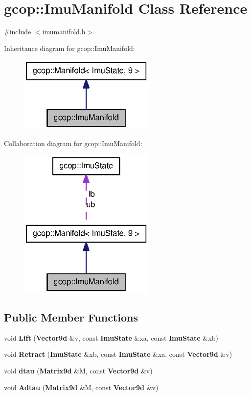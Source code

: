 \section{gcop\-:\-:\-Imu\-Manifold \-Class \-Reference}
\label{classgcop_1_1ImuManifold}


{\ttfamily \#include $<$imumanifold.\-h$>$}



\-Inheritance diagram for gcop\-:\-:\-Imu\-Manifold\-:\nopagebreak
\begin{figure}[H]
\begin{center}
\leavevmode
\includegraphics[width=192pt]{classgcop_1_1ImuManifold__inherit__graph}
\end{center}
\end{figure}


\-Collaboration diagram for gcop\-:\-:\-Imu\-Manifold\-:\nopagebreak
\begin{figure}[H]
\begin{center}
\leavevmode
\includegraphics[width=192pt]{classgcop_1_1ImuManifold__coll__graph}
\end{center}
\end{figure}
\subsection*{\-Public \-Member \-Functions}
\begin{DoxyCompactItemize}
\item 
void {\bf \-Lift} ({\bf \-Vector9d} \&v, const {\bf \-Imu\-State} \&xa, const {\bf \-Imu\-State} \&xb)
\item 
void {\bf \-Retract} ({\bf \-Imu\-State} \&xb, const {\bf \-Imu\-State} \&xa, const {\bf \-Vector9d} \&v)
\item 
void {\bf dtau} ({\bf \-Matrix9d} \&\-M, const {\bf \-Vector9d} \&v)
\item 
void {\bf \-Adtau} ({\bf \-Matrix9d} \&\-M, const {\bf \-Vector9d} \&v)
\end{DoxyCompactItemize}

